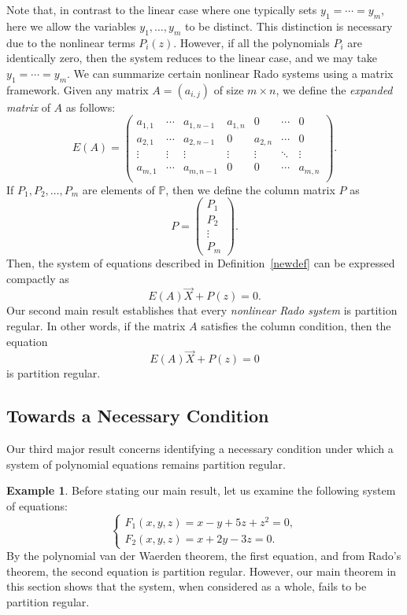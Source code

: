 \documentclass{article}
\theoremstyle{Theorem}
\theoremstyle{definition}
\newtheorem{example}[thm]{Example}
\newcommand{\Po}{\mathbb{P}}
\begin{document}
Note that, in contrast to the linear case where one typically sets \( y_1 = \cdots = y_m \), here we allow the variables \( y_1, \ldots, y_m \) to be distinct. This distinction is necessary due to the nonlinear terms \( P_i(z) \). However, if all the polynomials \( P_i \) are identically zero, then the system reduces to the linear case, and we may take \( y_1 = \cdots = y_m \). We can summarize certain nonlinear Rado systems using a matrix framework. Given any matrix \( A = (a_{i,j}) \) of size \( m \times n \), we define the \emph{expanded matrix} of \( A \) as follows:
 \[
E(A) =
\begin{pmatrix}
    a_{1,1} & \cdots & a_{1,n-1} & a_{1,n} & 0 &\cdots & 0 \\
    a_{2,1} & \cdots & a_{2,n-1} & 0 &a_{2,n}& \cdots & 0 \\
    \vdots & \vdots & \vdots & \vdots & \vdots & \ddots & \vdots \\
    a_{m,1} & \cdots & a_{m,n-1} & 0 & 0 & \cdots & a_{m,n} \\
\end{pmatrix}.
\]
If \( P_1, P_2, \ldots, P_m \) are elements of \( \Po \), then we define the column matrix \( P \) as
\[
P = \begin{pmatrix}
    P_1\\
    P_2\\
    \vdots \\
    P_m
\end{pmatrix}.
\]
 Then, the system of equations described in Definition~\ref{newdef} can be expressed compactly as
\[
E(A)\vec{X} + P(z) = 0.
\]
Our second main result establishes that every \emph{nonlinear Rado system} is partition regular. In other words, if the matrix \( A \) satisfies the column condition, then the equation
\[
E(A)\vec{X} + P(z) = 0
\]
is partition regular.


\medskip


\subsection{Towards a Necessary Condition}

Our third major result concerns identifying a necessary condition under which a system of polynomial equations remains partition regular.

\medskip
\begin{example}
    

Before stating our main result, let us examine the following system of equations:
\begin{equation} \label{eq:nonlinear-system}
\begin{cases}
    F_1(x,y,z)=x-y+5z+z^2=0,\\
    F_2(x,y,z)=x+2y-3z=0.
\end{cases}
\tag{A}
\end{equation}
By the polynomial van der Waerden theorem, the first equation, and from Rado's theorem, the second equation is partition regular. However, our main theorem in this section shows that the system, when considered as a whole, fails to be partition regular.
\end{example}
\end{document}
